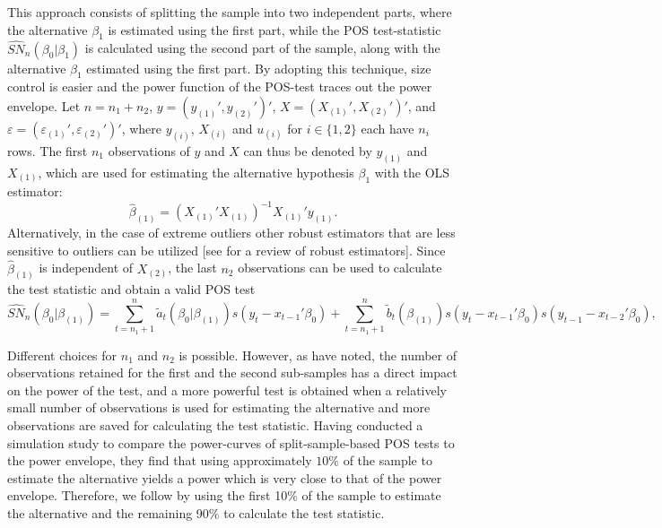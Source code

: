 \documentclass[harvard,11pt]{article}
\begin{document}
 This approach consists of splitting the sample into two independent parts, where
the alternative $\beta_1$ is estimated using the first part, while the POS test-statistic $\widehat{SN}_{n}(\beta _{0}|\beta _{1})%
$ is calculated using the second part of the sample, along with the alternative $\beta_1$ estimated using the first part. By adopting this technique, size control is easier and the power function of the POS-test traces out the power envelope.
Let $n=n_{1}+n_{2}$, 
$y=(y_{(1)}',y_{(2)}')'$, $X=(X_{(1)}',X_{(2)}')'$, and $\varepsilon=(\varepsilon_{(1)}',\varepsilon_{(2)}')'$, where $y_{(i)}$, $X_{(i)}$ and $u_{(i)}$ for $i\in \{1,2\}$ each have $%
n_{i}$ rows. The first $n_{1}$ observations of $y$ and $X$ can thus be denoted by $y_{(1)}$ and $X_{(1)}$, which
are used for estimating the alternative hypothesis $\beta _{1}$ with the OLS estimator: 
\begin{equation*}
\hat{\beta} _{(1)}=(X_{(1)}'X_{(1)})^{-1}X_{(1)}'y_{(1)}.
\end{equation*}%
Alternatively, in the case of extreme outliers other robust estimators that are less sensitive to outliers can be utilized [see \citet{maronna2019robust} for a review of robust estimators]. Since $\hat{\beta}_{(1)}$ is independent of $X_{(2)}$, the last $n_{2}$
observations can be used to calculate the test statistic and obtain a valid POS
test
\begin{equation*}
\widehat{SN}_{n}(\beta _{0}|\beta _{(1)})=\sum\limits_{t=n_1+1}^{n}\tilde{a}%
_{t}(\beta _{0}|\beta _{(1)})s(y_{t}-x_{t-1}'\beta
_{0})+\sum\limits_{t=n_1+1}^{n}\tilde{b}_{t}(\beta _{(1)})%
s(y_{t}-x_{t-1}'\beta _{0})s(y_{t-1}-x_{t-2}'\beta _{0}),
\end{equation*}%

Different choices for $n_{1}$ and $n_{2}$ is possible. However, as
\citet{dufour2010exact} have noted, the number of observations retained
for the first and the second sub-samples has a direct impact on the power of
the test, and a more powerful test is obtained
when a relatively small number of observations is used for estimating the
alternative and more observations are saved for calculating
the test statistic. Having conducted a simulation
study to compare the power-curves of split-sample-based POS tests to the
power envelope, they find that using approximately $10\%$ of the sample to
estimate the alternative yields a power which is very close to that of the power
envelope. Therefore, we follow \citet{dufour2010exact} by using the first 10\% of the sample to estimate 
the alternative and the remaining 90\% to calculate the test statistic. 
\end{document}

